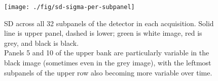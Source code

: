 \documentclass[10pt,fleqn]{article}
\begin{document}
\clearpage

\begin{figure}[!ht]
\caption{SD across all 32 subpanels of the detector in each acquisition. Solid line is upper panel, dashed is lower; green is white image, red is grey, and black is black. \\ Panels 5 and 10 of the upper bank are particularly variable in the black image (sometimes even in the grey image), with the leftmost subpanels of the upper row also becoming more variable over time.}
\centering
\texttt{[image: ./fig/sd-sigma-per-subpanel]}
\end{figure}

\clearpage
\end{document}
